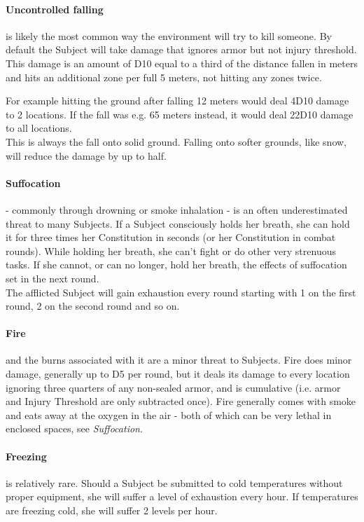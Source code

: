 \documentclass[11pt,a4paper,openany,dvipsnames]{book}
\begin{document}
	\paragraph{Uncontrolled falling} is likely the most common way the environment will try to kill someone.
	By default the Subject will take damage that ignores armor but not injury threshold.
	This damage is an amount of D10 equal to a third of the distance fallen in meters
		and hits an additional zone per full 5 meters,
		not hitting any zones twice.
	\\%
	\begin{exampleblock}
		For example hitting the ground after falling
			12 meters would
			deal 4D10 damage
			to 2 locations.
		If the fall was e.g. 65 meters instead,
			it would deal 22D10 damage to all locations.\\
		This is always the fall onto solid ground.
		Falling onto softer grounds, like snow,
			will reduce the damage by up to half.
	\end{exampleblock}
	\paragraph{Suffocation}- commonly through drowning or smoke inhalation - is an often underestimated threat to many Subjects.
	\label{hazards:suffocation}
	If a Subject consciously holds her breath,
		she can hold it for
		three times her Constitution in seconds (or her Constitution in combat rounds).
	While holding her breath, she can’t fight or do other very strenuous tasks.
	If she cannot, or can no longer, hold her breath, the effects of suffocation set in the next round.
	\\%
	The afflicted Subject will gain exhaustion every round starting with 1 on the first round, 2 on the second round and so on.
	\paragraph{Fire} and the burns associated with it are a minor threat to Subjects.
	Fire does minor damage, generally up to D5 per round,
		but it deals its damage to every location ignoring three quarters of any non-sealed armor,
		and is cumulative (i.e. armor and Injury Threshold are only subtracted once).
	Fire generally comes with smoke and eats away at the oxygen in the air
		- both of which can be very lethal in enclosed spaces, see \emph{Suffocation}.
	\paragraph{Freezing} is relatively rare.
		Should a Subject be submitted to cold temperatures without proper equipment,
			she will suffer a level of exhaustion every hour.
		If temperatures are freezing cold, she will suffer 2 levels per hour.
\end{document}
